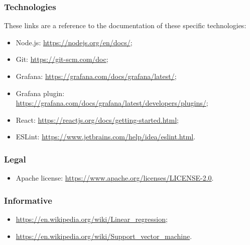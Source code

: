 \subsubsection{Technologies}
These links are a reference to the documentation of these specific technologies:
\begin{itemize}
	\item Node.js: \url{https://nodejs.org/en/docs/};
	\item Git: \url{https://git-scm.com/doc};
	\item Grafana: \url{https://grafana.com/docs/grafana/latest/};
	\item Grafana plugin: \url{https://grafana.com/docs/grafana/latest/developers/plugins/};
	\item React: \url{https://reactjs.org/docs/getting-started.html};
	\item ESLint: \url{https://www.jetbrains.com/help/idea/eslint.html}.
\end{itemize}
\subsubsection{Legal}
\begin{itemize}
	\item Apache license: \url{https://www.apache.org/licenses/LICENSE-2.0}.
\end{itemize}

\subsubsection{Informative}
\begin{itemize}
	\item \url{https://en.wikipedia.org/wiki/Linear_regression};
	\item \url{https://en.wikipedia.org/wiki/Support_vector_machine}.
\end{itemize}
	


